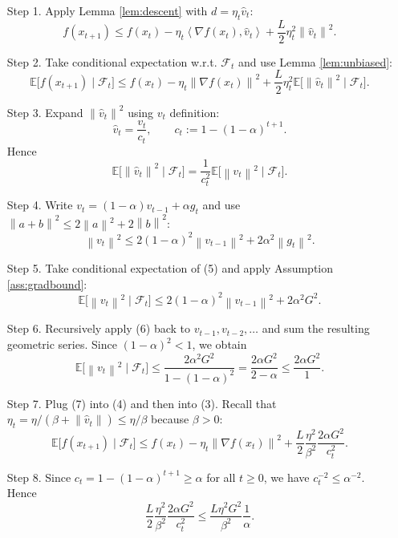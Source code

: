 \documentclass{article}
\newcommand{\E}{\mathbb{E}}
\newcommand{\norm}[1]{\left\|#1\right\|}
\newcommand{\ip}[2]{\left\langle #1, #2 \right\rangle}
\newcommand{\grad}{\nabla}
\begin{document}
\begin{enumerate}
\item[Step 1.] Apply Lemma \ref{lem:descent} with $d=\eta_t\hat v_t$:
\[
f(x_{t+1})\le f(x_t)-\eta_t\ip{\grad f(x_t)}{\hat v_t}
+\frac{L}{2}\eta_t^{2}\norm{\hat v_t}^{2}. \tag{2}
\]

\item[Step 2.] Take conditional expectation w.r.t. $\mathcal{F}_t$ and use Lemma \ref{lem:unbiased}:
\[
\E\!\big[f(x_{t+1})\mid\mathcal{F}_t\big]
\le f(x_t)-\eta_t\norm{\grad f(x_t)}^{2}
+\frac{L}{2}\eta_t^{2}\E\!\big[\norm{\hat v_t}^{2}\mid\mathcal{F}_t\big]. \tag{3}
\]

\item[Step 3.] Expand $\norm{\hat v_t}^{2}$ using $v_t$ definition:
\[
\hat v_t =\frac{v_t}{c_t},\qquad c_t:=1-(1-\alpha)^{t+1}.
\]
Hence
\[
\E\!\big[\norm{\hat v_t}^{2}\mid\mathcal{F}_t\big]
=\frac{1}{c_t^{2}}\E\!\big[\norm{v_t}^{2}\mid\mathcal{F}_t\big]. \tag{4}
\]

\item[Step 4.] Write $v_t=(1-\alpha)v_{t-1}+\alpha g_t$ and use
$\norm{a+b}^{2}\le 2\norm{a}^{2}+2\norm{b}^{2}$:
\[
\norm{v_t}^{2}\le 2(1-\alpha)^{2}\norm{v_{t-1}}^{2}+2\alpha^{2}\norm{g_t}^{2}. \tag{5}
\]

\item[Step 5.] Take conditional expectation of (5) and apply Assumption \ref{ass:gradbound}:
\[
\E\!\big[\norm{v_t}^{2}\mid\mathcal{F}_t\big]
\le 2(1-\alpha)^{2}\norm{v_{t-1}}^{2}+2\alpha^{2}G^{2}. \tag{6}
\]

\item[Step 6.] Recursively apply (6) back to $v_{t-1},v_{t-2},\dots$ and sum the resulting geometric series.
Since $(1-\alpha)^{2}<1$, we obtain
\[
\E\!\big[\norm{v_t}^{2}\mid\mathcal{F}_t\big]
\le \frac{2\alpha^{2}G^{2}}{1-(1-\alpha)^{2}}
= \frac{2\alpha G^{2}}{2-\alpha}
\le \frac{2\alpha G^{2}}{1}. \tag{7}
\]

\item[Step 7.] Plug (7) into (4) and then into (3). Recall that $\eta_t=\eta/(\beta+\norm{\hat v_t})\le \eta/\beta$ because $\beta>0$:
\[
\E\!\big[f(x_{t+1})\mid\mathcal{F}_t\big]
\le f(x_t)-\eta_t\norm{\grad f(x_t)}^{2}
+\frac{L}{2}\frac{\eta^{2}}{\beta^{2}}\frac{2\alpha G^{2}}{c_t^{2}}. \tag{8}
\]

\item[Step 8.] Since $c_t=1-(1-\alpha)^{t+1}\ge \alpha$ for all $t\ge0$, we have $c_t^{-2}\le\alpha^{-2}$. Hence
\[
\frac{L}{2}\frac{\eta^{2}}{\beta^{2}}\frac{2\alpha G^{2}}{c_t^{2}}
\le \frac{L\eta^{2}G^{2}}{\beta^{2}}\frac{1}{\alpha}. \tag{9}
\]


\end{enumerate}
\end{document}
